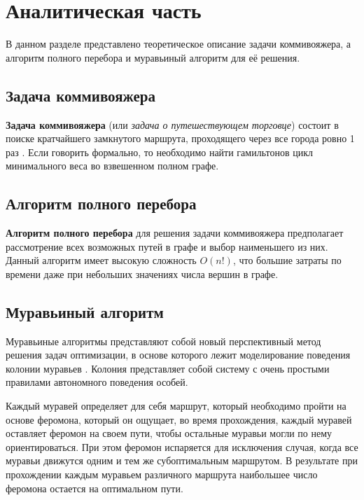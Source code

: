 \chapter{Аналитическая часть}

В данном разделе представлено теоретическое описание задачи коммивояжера, а
алгоритм полного перебора и муравьиный алгоритм для её решения.

\section{Задача коммивояжера}

\textbf{Задача коммивояжера} (или \textit{задача о путешествующем торговце})
состоит в поиске кратчайшего замкнутого маршрута, проходящего через все города
ровно 1 раз \cite{Shtovba}. Если говорить формально, то необходимо найти
гамильтонов цикл минимального веса во взвешенном полном графе.

\section{Алгоритм полного перебора}

\textbf{Алгоритм полного перебора} для решения задачи коммивояжера предполагает
рассмотрение всех возможных путей в графе и выбор наименьшего из них. Данный
алгоритм имеет высокую сложность $O(n!)$, что большие затраты по времени даже
при небольших значениях числа вершин в графе.

\section{Муравьиный алгоритм}

Муравьиные алгоритмы представляют собой новый перспективный метод решения задач
оптимизации, в основе которого лежит моделирование поведения колонии муравьев
\cite{Ulianov}. Колония представляет собой систему с очень простыми правилами
автономного поведения особей.

Каждый муравей определяет для себя маршрут, который необходимо пройти на основе
феромона, который он ощущает, во время прохождения, каждый муравей оставляет
феромон на своем пути, чтобы остальные муравьи могли по нему ориентироваться.
При этом феромон испаряется для исключения случая, когда все муравьи движутся
одним и тем же субоптимальным маршрутом. В результате при прохождении каждым
муравьем различного маршрута наибольшее число феромона остается на оптимальном
пути.

